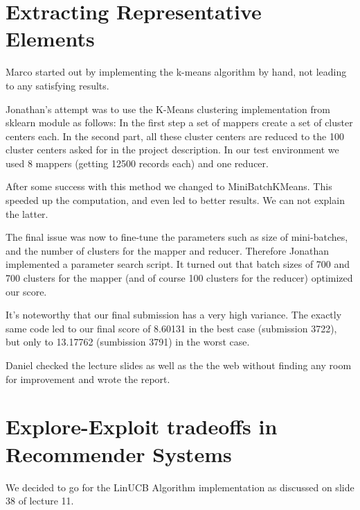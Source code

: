 \documentclass[a4paper, 11pt]{article}
\begin{document}
\maketitle

\section*{Extracting Representative Elements}

Marco started out by implementing the k-means algorithm by hand, not leading to any satisfying results.

Jonathan's attempt was to use the K-Means clustering implementation from sklearn module as follows: In the first step a set of mappers create a set of cluster centers each. In the second part, all these cluster centers are reduced to the 100 cluster centers asked for in the project description. In our test environment we used 8 mappers (getting 12500 records each) and one reducer.

After some success with this method we changed to MiniBatchKMeans. This speeded up the computation, and even led to better results. We can not explain the latter.

The final issue was now to fine-tune the parameters such as size of mini-batches, and the number of clusters for the mapper and reducer. Therefore Jonathan implemented a parameter search script. It turned out that batch sizes of 700 and 700 clusters for the mapper (and of course 100 clusters for the reducer) optimized our score.

It's noteworthy that our final submission has a very high variance. The exactly same code led to our final score  of 8.60131 in the best case (submission 3722), but only to 13.17762 (sumbission 3791) in the worst case.

Daniel checked the lecture slides as well as the the web without finding any room for improvement and wrote the report.

\maketitle

\section*{Explore-Exploit tradeoffs in Recommender Systems}

We decided to go for the LinUCB Algorithm implementation as discussed on slide 38 of lecture 11.
\end{document}
